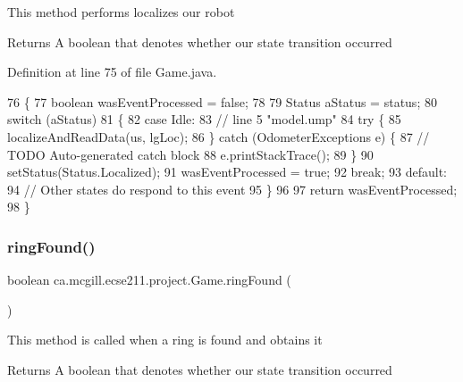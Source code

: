 This method performs localizes our robot

\begin{DoxyReturn}{Returns}
A boolean that denotes whether our state transition occurred 
\end{DoxyReturn}


Definition at line 75 of file Game.\+java.


\begin{DoxyCode}
76   \{
77     \textcolor{keywordtype}{boolean} wasEventProcessed = \textcolor{keyword}{false};
78     
79     Status aStatus = status;
80     \textcolor{keywordflow}{switch} (aStatus)
81     \{
82       \textcolor{keywordflow}{case} Idle:
83         \textcolor{comment}{// line 5 "model.ump"}
84         \textcolor{keywordflow}{try} \{
85           localizeAndReadData(us, lgLoc);
86         \} \textcolor{keywordflow}{catch} (OdometerExceptions e) \{
87           \textcolor{comment}{// TODO Auto-generated catch block}
88           e.printStackTrace();
89         \}
90         setStatus(Status.Localized);
91         wasEventProcessed = \textcolor{keyword}{true};
92         \textcolor{keywordflow}{break};
93       \textcolor{keywordflow}{default}:
94         \textcolor{comment}{// Other states do respond to this event}
95     \}
96 
97     \textcolor{keywordflow}{return} wasEventProcessed;
98   \}
\end{DoxyCode}
\mbox{\label{enumca_1_1mcgill_1_1ecse211_1_1project_1_1_game_a62d510506f1b829fe67dea7270e5b889}} 
\subsubsection{\texorpdfstring{ring\+Found()}{ringFound()}}
{\footnotesize\ttfamily boolean ca.\+mcgill.\+ecse211.\+project.\+Game.\+ring\+Found (\begin{DoxyParamCaption}{ }\end{DoxyParamCaption})}

This method is called when a ring is found and obtains it

\begin{DoxyReturn}{Returns}
A boolean that denotes whether our state transition occurred 
\end{DoxyReturn}


